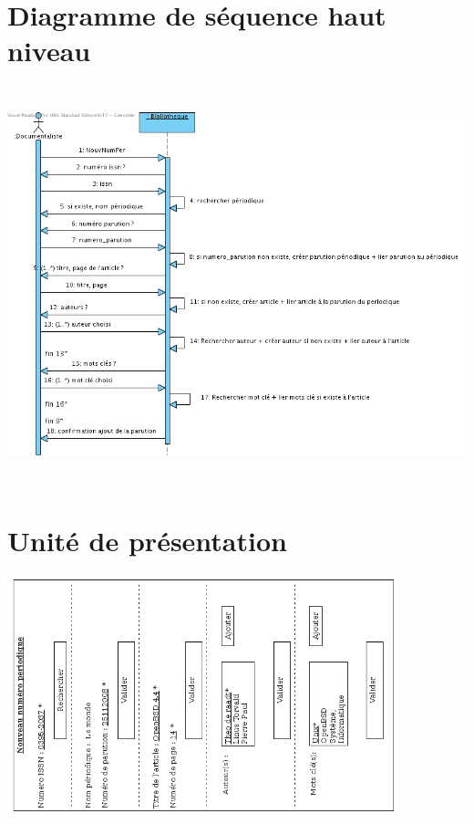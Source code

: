\documentclass[a4paper,10pt]{report}
\begin{document}
\bigskip

\section*{Diagramme de séquence haut niveau}
\includegraphics[height=115mm]{NouvNumPerHautNiveau.png}

\newpage

\section*{Unité de présentation}
\includegraphics[height=70mm]{UpNouvNumPer.png}
\end{document}
